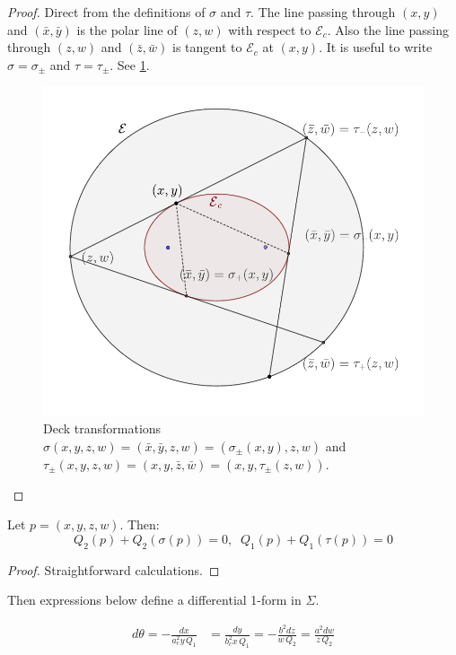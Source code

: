 \begin{proof} Direct from the definitions of $\sigma$ and $\tau$. The line passing through $(x,y)$ and $(\bar x, \bar y)$ is the polar line of $(z,w)$ with respect to $\mathcal{E}_c$. Also the line passing through $(z,w) $ and $(\bar z,\bar w)$ is tangent to $\mathcal{E}_c$ at $(x,y)$. It is useful to write $\sigma=\sigma_{\pm}$ and $\tau=\tau_{\pm}$. See \cref{fig:05-pics-poncelet-bryant}.
\begin{figure}
    \centering
    \includegraphics[scale=0.5]{chap_05/pics/pics-05-0010-bryant_poncelet_pair.pdf}
    \caption{Deck transformations $\sigma (x,y,z,w)=(\bar x,\bar y,z,w)=(\sigma_{\pm}(x,y),z,w)$ and $\tau_{\pm}(x,y,z,w)=(x,y,\bar z,\bar w)= (x,y, \tau_{\pm}(z,w) )$. }
    \label{fig:05-pics-poncelet-bryant}
\end{figure}
\end{proof}

\begin{lemma} Let $p=(x,y,z,w)$.
Then:
\[
       Q_2(p)+   Q_2(\sigma(p))=0,\;\;     Q_1(p)+   Q_1(\tau(p))=0
\]
\label{lem:05-m-odd}
\end{lemma}

\begin{proof} Straightforward calculations.
\end{proof}

\begin{proposition}
Then expressions below define a differential 1-form in $\Sigma.$

\begin{align*}
  d\theta=  -\frac{dx}{ a_c^2 y\,    Q_1}& =  \frac{dy}{b_c^2 x\,    Q_1}= -\frac{b^2dz}{w\,    Q_2}=\frac{a^2 dw}{z \,   Q_2}\\
\end{align*}
\end{proposition}

